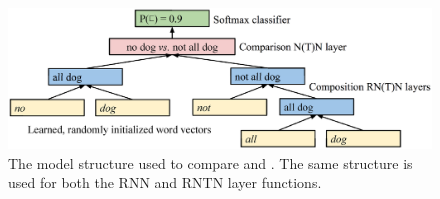 \begin{figure}[htp]
  \centering
  \includegraphics[scale=0.35]{model.eps}
  \caption{The model structure used to compare  and . 
    The same structure is used for both the RNN and RNTN layer functions.} 
  \label{sample-figure}
\end{figure}


